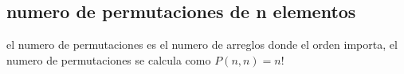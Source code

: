 \subsection{numero de permutaciones de n elementos}
el numero de permutaciones es el numero de arreglos donde el orden importa, el numero de permutaciones
se calcula como $P(n,n)=n!$
